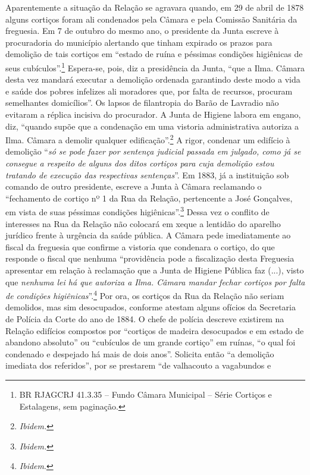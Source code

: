 Aparentemente a situação da Relação se agravara quando, em 29 de abril
de 1878 alguns cortiços foram ali condenados pela Câmara e pela Comissão
Sanitária da freguesia. Em 7 de outubro do mesmo ano, o presidente da
Junta escreve à procuradoria do município alertando que tinham expirado
os prazos para demolição de tais cortiços em ``estado de ruína e
péssimas condições higiênicas de seus cubículos''.\footnote{BR RJAGCRJ
  41.3.35 -- Fundo Câmara Municipal -- Série Cortiços e Estalagens, sem
  paginação.} Espera-se, pois, diz a presidência da Junta, ``que a Ilma.
Câmara desta vez mandará executar a demolição ordenada garantindo deste
modo a vida e saúde dos pobres infelizes ali moradores que, por falta de
recursos, procuram semelhantes domicílios''. Os lapsos de filantropia do
Barão de Lavradio não evitaram a réplica incisiva do procurador. A Junta
de Higiene labora em engano, diz, ``quando supõe que a condenação em uma
vistoria administrativa autoriza a Ilma. Câmara a demolir qualquer
edificação''.\footnote{\emph{Ibidem.}} A rigor, condenar um edifício à
demolição ``\emph{só se pode fazer por sentença judicial passada em
julgado, como já se consegue a respeito de alguns dos ditos cortiços
para cuja demolição estou tratando de execução das respectivas
sentenças}''. Em 1883, já a instituição sob comando de outro presidente,
escreve a Junta à Câmara reclamando o ``fechamento de cortiço nº 1 da
Rua da Relação, pertencente a José Gonçalves, em vista de suas péssimas
condições higiênicas''.\footnote{\emph{Ibidem.}} Dessa vez o conflito de
interesses na Rua da Relação não colocará em xeque a lentidão do
aparelho jurídico frente à urgência da saúde pública. A Câmara pede
imediatamente ao fiscal da freguesia que confirme a vistoria que
condenara o cortiço, do que responde o fiscal que nenhuma ``providência
pode a fiscalização desta Freguesia apresentar em relação à reclamação
que a Junta de Higiene Pública faz (...), visto que \emph{nenhuma lei há
que autoriza a Ilma. Câmara mandar fechar cortiços por falta de
condições higiênicas}''.\footnote{\emph{Ibidem}.} Por ora, os cortiços
da Rua da Relação não seriam demolidos, mas sim desocupados, conforme
atestam alguns ofícios da Secretaria de Polícia da Corte do ano de 1884.
O chefe de polícia descreve existirem na Relação edifícios compostos por
``cortiços de madeira desocupados e em estado de abandono absoluto'' ou
``cubículos de um grande cortiço'' em ruínas, ``o qual foi condenado e
despejado há mais de dois anos''. Solicita então ``a demolição imediata
dos referidos'', por se prestarem ``de valhacouto a vagabundos e
